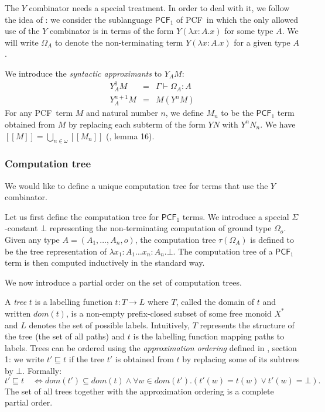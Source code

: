 \documentclass{llncs}
\newcommand{\lsem}{[\![} %
\newcommand{\rsem}{]\!]} %
\newcommand{\sem}[1]{{\lsem #1 \rsem}}
\newcommand\Union{\bigcup}
\newcommand\pcf{\textsf{PCF}}
\begin{document}
The $Y$ combinator needs a special treatment. In order to deal with
it, we follow the idea of \cite{abramsky:game-semantics-tutorial}:
we consider the sublanguage $\pcf_1$ of \pcf\ in which the only
allowed use of the $Y$ combinator is in terms of the form $Y(
\lambda x:A .x )$ for some type $A$. We will write $\Omega_A$ to
denote the non-terminating term $Y(\lambda x:A .x)$ for a given type
$A$.

We introduce the \emph{syntactic approximants} to $Y_A M$:
\begin{eqnarray*}
Y^0_A M &=& \Gamma \vdash \Omega_A : A\\
Y^{n+1}_A M &=& M( Y^n M )
\end{eqnarray*}
For any \pcf\ term $M$ and natural number $n$, we define $M_n$ to be
the $\pcf_1$ term obtained from $M$ by replacing each subterm of the
form $Y N$ with $Y^n N_n$. We have $\sem{M} = \Union_{n\in\omega}
\sem{M_n}$ (\cite{abramsky:game-semantics-tutorial}, lemma 16).


\subsubsection{Computation tree}

We would like to define a unique computation tree for terms that use
the $Y$ combinator.

Let us first define the computation tree for $\pcf_1$ terms. We
introduce a special $\Sigma$-constant $\bot$ representing the
non-terminating computation of ground type $\Omega_o$. Given any
type $A = (A_1, \ldots, A_n, o)$, the computation tree
$\tau(\Omega_A)$ is defined to be the tree representation of
$\lambda x_1:A_1 \ldots x_n:A_n . \bot$. The computation tree of a
$\pcf_1$ term is then computed inductively in the standard way.

We now introduce a partial order on the set of computation trees.

A \emph{tree} $t$ is a labelling function $t:T\rightarrow L$ where
$T$, called the domain of $t$ and written $dom(t)$, is a non-empty
prefix-closed subset of some free monoid $X^*$ and $L$ denotes the
set of possible labels. Intuitively, $T$ represents the structure of
the tree (the set of all paths) and $t$ is the labelling function
mapping paths to labels. Trees can be ordered using the
\emph{approximation ordering} defined in \cite{KNU02}, section 1: we
write $t' \sqsubseteq t$ if the tree $t'$ is obtained from $t$ by
replacing some of its subtrees by $\bot$. Formally:
$$t' \sqsubseteq t \quad \iff dom(t') \subseteq dom(t) \wedge \forall  w \in dom(t'). (t'(w) = t(w) \vee t'(w) = \bot).$$
The set of all trees together with the approximation ordering is a
complete partial order.
\end{document}
